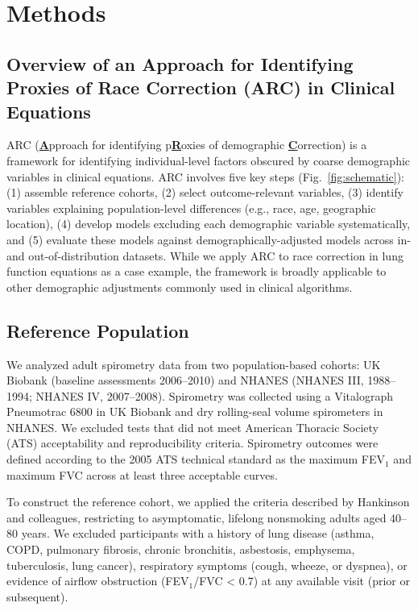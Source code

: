 \documentclass[10pt]{extarticle}
\begin{document}
\section{Methods}\label{methods}

\subsection{Overview of an Approach for Identifying Proxies of Race Correction (ARC) in Clinical Equations}\label{overview-of-an-approach-for-identifying-proxies-of-race-correction-arc-in-clinical-equations}

ARC (\textbf{\underline{A}}pproach for identifying p\textbf{\underline{R}}oxies of demographic \textbf{\underline{C}}orrection) is a framework for identifying individual-level factors obscured by coarse demographic variables in clinical equations. ARC involves five key steps (Fig.~\ref{fig:schematic}): (1) assemble reference cohorts, (2) select outcome-relevant variables, (3) identify variables explaining population-level differences (e.g., race, age, geographic location), (4) develop models excluding each demographic variable systematically, and (5) evaluate these models against demographically-adjusted models across in- and out-of-distribution datasets. While we apply ARC to race correction in lung function equations as a case example, the framework is broadly applicable to other demographic adjustments commonly used in clinical algorithms.

\subsection{Reference Population}\label{reference-population}

We analyzed adult spirometry data from two population-based cohorts: UK Biobank (baseline assessments 2006--2010) and NHANES (NHANES III, 1988--1994; NHANES IV, 2007--2008). Spirometry was collected using a Vitalograph Pneumotrac 6800 in UK Biobank and dry rolling-seal volume spirometers in NHANES. We excluded tests that did not meet American Thoracic Society (ATS) acceptability and reproducibility criteria. Spirometry outcomes were defined according to the 2005 ATS technical standard as the maximum FEV$_{1}$ and maximum FVC across at least three acceptable curves\cite{Miller2005-de}.

To construct the reference cohort, we applied the criteria described by Hankinson and colleagues, restricting to asymptomatic, lifelong nonsmoking adults aged 40--80 years. We excluded participants with a history of lung disease (asthma, COPD, pulmonary fibrosis, chronic bronchitis, asbestosis, emphysema, tuberculosis, lung cancer), respiratory symptoms (cough, wheeze, or dyspnea), or evidence of airflow obstruction (FEV$_{1}$/FVC < 0.7) at any available visit (prior or subsequent)\cite{Hankinson1999-qt}.
\end{document}
